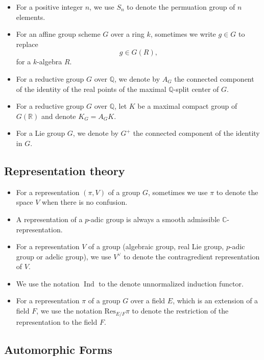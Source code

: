 \documentclass[11pt, a4paper]{amsart}
\theoremstyle{plain}
\theoremstyle{definition}
\numberwithin{equation}{section}
\def\CC{\mathbb{C}}
\def\QQ{\mathbb{Q}}
\def\RR{\mathbb{R}}
\DeclareMathOperator{\Ind}{Ind}
\begin{document}
\begin{itemize}
    \item For a positive integer $n$, we use $S_{n}$ to denote the permuation group of $n$ elements. 
    \item For an affine group scheme $G$ over a ring $k$, sometimes we write $g \in G$ to replace 
          \begin{equation*}
              g \in G(R),
          \end{equation*}
          for a $k$-algebra $R$. 
    \item For a reductive group $G$ over $\QQ$, we denote by $A_{G}$ the connected component of the identity of the real points of the maximal $\QQ$-split center of $G$.  
    \item For a reductive group $G$ over $\QQ$, let $K$ be a maximal compact group of $G(\RR)$ and denote $K_{G} = A_{G} K$. 
    \item For a Lie group $G$, we denote by $G^{+}$ the connected component of the identity in $G$. 
\end{itemize}

\subsection*{Representation theory}

\begin{itemize}
    \item For a representation $(\pi, V)$ of a group $G$, sometimes we use $\pi$ to denote the space $V$ when there is no confusion. 
    \item A representation of a $p$-adic group is always a smooth admissible $\CC$-representation.
    \item For a representation $V$ of a group (algebraic group, real Lie group, $p$-adic group or adelic group), we use $V^{\vee}$ to denote the contragredient representation of $V$. 
    \item We use the notation $\Ind$ to the denote unnormalized induction functor. 
    \item For a representation $\pi$ of a group $G$ over a field $E$, which is an extension of a field $F$, we use the notation $\mathrm{Res}_{E/F} \pi$ to denote the restriction of the representation to the field $F$. 
\end{itemize}

\subsection*{Automorphic Forms}
\end{document}
